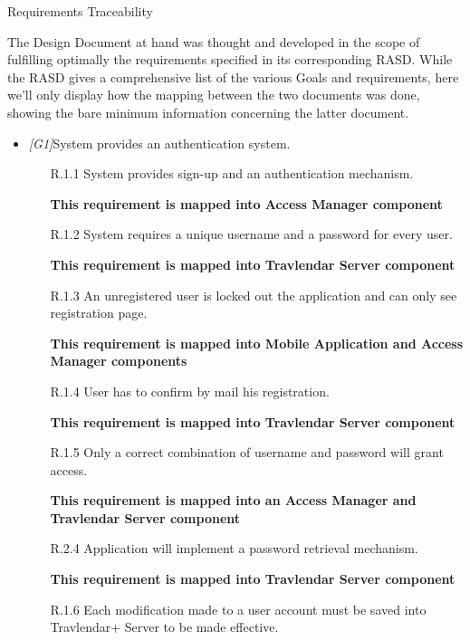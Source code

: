Requirements Traceability

The Design Document at hand was thought and developed in the scope of fulfilling optimally the requirements specified in its corresponding RASD. While the RASD gives a comprehensive list of the various Goals and requirements, here we'll only display how the mapping between the two documents was done, showing the bare minimum information concerning the latter document.

\begin{itemize}

	

	\item \textit{[G1]}System provides an authentication system.

		\begin{itemize}

			\item [R.1.1] System provides sign-up and an authentication mechanism.
			
			\textbf{This requirement is mapped into Access Manager component}

			\item [R.1.2] System requires a unique username and a password for every user.
			
			\textbf{This requirement is mapped into Travlendar Server component}

			\item [R.1.3] An unregistered user is locked out the application and can only see registration page.
			
			\textbf{This requirement is mapped into Mobile Application and Access Manager components}

			\item [R.1.4] User has to confirm by mail his registration.
			
			\textbf{This requirement is mapped into Travlendar Server component}

			\item [R.1.5] Only a correct combination of username and password will grant access.
			
			\textbf{This requirement is mapped into an Access Manager and Travlendar Server component}

     \item [R.2.4] Application will implement a password retrieval mechanism.
     
     \textbf{This requirement is mapped into Travlendar Server component}

			\item [R.1.6] Each modification made to a user account must be saved into Travlendar+ Server to be made effective.


\end{itemize}
\end{itemize}
